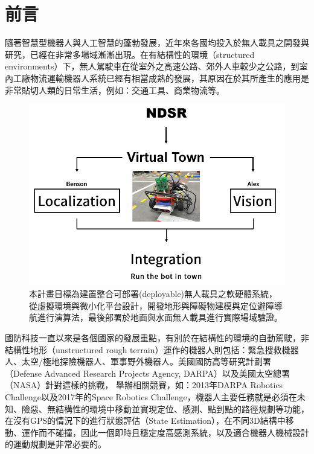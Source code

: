 \section{前言}

隨著智慧型機器人與人工智慧的蓬勃發展，近年來各國均投入於無人載具之開發與研究，已經在非常多場域漸漸出現。在有結構性的環境（structured environments）下，無人駕駛車在從室外之高速公路、郊外人車較少之公路，到室內工廠物流運輸機器人系統已經有相當成熟的發展，其原因在於其所產生的應用是非常貼切人類的日常生活，例如：交通工具、商業物流等。

\begin{figure}[t]
  \centering
    \includegraphics[width=\columnwidth]{images/teaser.png}
        \caption{本計畫目標為建置整合可部署(deployable)無人載具之軟硬體系統，從虛擬環境與微小化平台設計，開發地形與障礙物建模與定位避障導航進行演算法，最後部署於地面與水面無人載具進行實際場域驗證。}
 \label{figure:teaser}
\end{figure}

國防科技一直以來是各個國家的發展重點，有別於在結構性的環境的自動駕駛，非結構性地形（unstructured rough terrain）運作的機器人則包括：緊急搜救機器人、太空/極地探險機器人、軍事野外機器人。美國國防高等研究計劃署 （Defense Advanced Research Projects Agency, DARPA）以及美國太空總署（NASA）針對這樣的挑戰， 舉辦相關競賽，如：2013年DARPA Robotics Challenge以及2017年的Space Robotics Challenge，機器人主要任務就是必須在未知、險惡、無結構性的環境中移動並實現定位、感測、點到點的路徑規劃等功能，在沒有GPS的情況下的進行狀態評估（State Estimation），在不同3D結構中移動、運作而不碰撞，因此一個即時且穩定度高感測系統，以及適合機器人機械設計的運動規劃是非常必要的。


